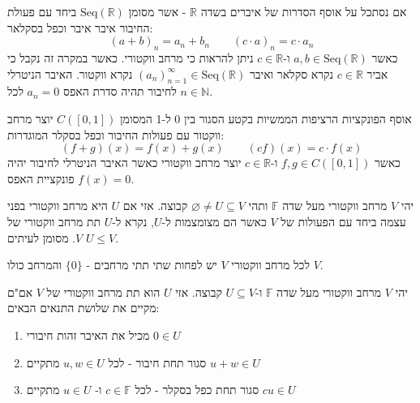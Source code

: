 \documentclass{tstextbook}
\begin{document}
\begin{example}
אם נסתכל על אוסף הסדרות של איברים בשדה \(\mathbb{R}\) - אשר מסומן \(\mathrm{Seq}\left( \mathbb{R} \right)\) ביחד עם פעולת החיבור איבר איבר וכפל בסקלאר:
$$(a+b)_{n}=a_{n}+b_{n}\qquad \left( c\cdot a \right)_{n}=c\cdot a_{n}$$
כאשר \(a,b \in \mathrm{Seq}\left( \mathbb{R} \right)\) ו-\(c \in \mathbb{R}\) ניתן להראות כי מרחב ווקטורי. כאשר במקרה זה נקבל כי אביר \(c \in \mathbb{R}\) נקרא סקלאר ואיבר \((a_n)_{n=1}^\infty \in \mathrm{Seq}\left( \mathbb{R}\right)\) נקרא ווקטור. האיבר הניטרלי לחיבור תהיה סדרת האפס \(a_{n}=0\) לכל \(n \in \mathbb{N}\).

\end{example}
\begin{example}
אוסף הפונקציות הרציפות הממשיות בקטע הסגור בין 0 ל-1 המסומן \(C([0,1])\) יוצר מרחב ווקטור עם פעולות החיבור וכפל בסקלר המוגדרות:
$$(f+g)(x)=f(x)+g(x)\qquad (cf)(x)=c\cdot f(x)$$
כאשר \(f,g \in C([0,1])\) ו-\(c \in \mathbb{R}\) יוצר מרחב ווקטורי כאשר האיבר הניטרלי לחיבור יהיה פונקציית האפס \(f(x)=0\).

\end{example}
\begin{definition}
יהי \(V\) מרחב ווקטורי מעל שדה \(\mathbb{F}\) ותהי \(\varnothing\neq U\subseteq V\) קבוצה. אזי אם \(U\) היא מרחב ווקטורי בפני עצמה ביחד עם הפעולות של \(V\) כאשר הם מצומצמות ל-\(U\), נקרא ל-\(U\) תת מרחב ווקטורי של \(V\). מסומן לעיתים \(U\leq V\).

\end{definition}
\begin{proposition}
לכל מרחב ווקטורי \(V\) יש לפחות שתי תתי מרחבים - \(\{ 0 \}\) והמרחב כולו \(V\).

\end{proposition}
\begin{proposition}
יהי \(V\) מרחב ווקטורי מעל שדה \(\mathbb{F}\) ו-\(U\subseteq V\) קבוצה. אזי \(U\) הוא תת מרחב ווקטורי של \(V\) אם"ם מקיים את שלושת התנאים הבאים:

  \begin{enumerate}
    \item מכיל את האיבר זהות חיבורי \(0 \in U\)


    \item סגור תחת חיבור - לכל \(u,w \in U\) מתקיים \(u+w \in U\)


    \item סגור תחת כפל בסקלר - לכל \(c \in \mathbb{F}\) ו- \(u \in U\) מתקיים \(cu \in U\)


  \end{enumerate}
\end{proposition}
\end{document}
